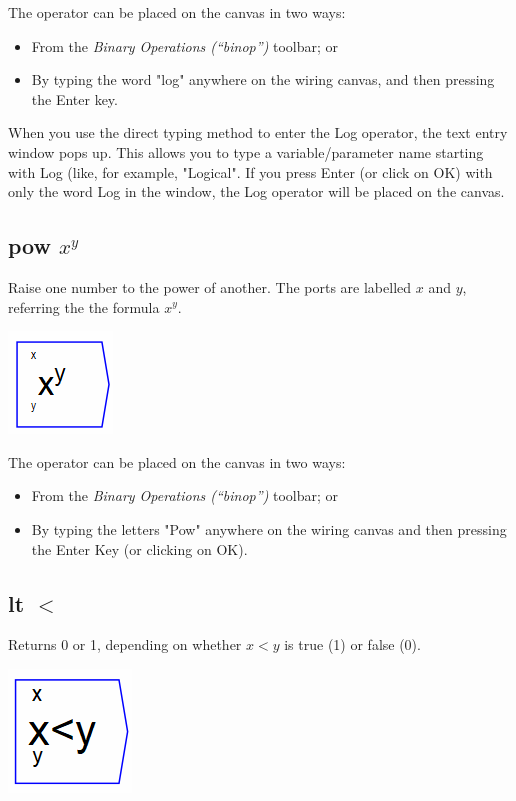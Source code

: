 The operator can be placed on the canvas in two ways:
\begin{itemize}
\item From the \emph{Binary Operations (``binop'')} toolbar; or 
\item By typing the word "log" anywhere on the wiring canvas, and then
pressing the Enter key. 
\end{itemize}
When you use the direct typing method to enter the Log operator, the
text entry window pops up. This allows you to type a variable/parameter
name starting with Log (like, for example, "Logical". If you press
Enter (or click on OK) with only the word Log in the window, the Log
operator will be placed on the canvas.

\subsection{pow $x^{y}$}

\label{Operation:pow} Raise one number to the power of another. The
ports are labelled $x$ and $y$, referring the the formula $x^{y}$.

\includegraphics{images/PowerKey}

The operator can be placed on the canvas in two ways:
\begin{itemize}
\item From the \emph{Binary Operations (``binop'')} toolbar; or 
\item By typing the letters "Pow" anywhere on the wiring canvas and then
pressing the Enter Key (or clicking on OK). 
\end{itemize}

\subsection{lt $<$}

\label{Operation:lt} Returns 0 or 1, depending on whether $x<y$
is true (1) or false (0).

\includegraphics{images/LessThanKey}

